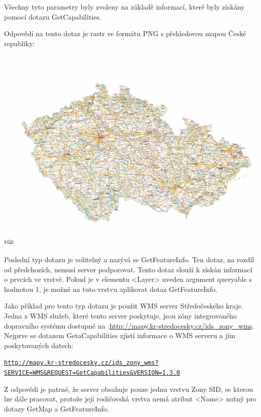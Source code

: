\documentclass[a4paper,12pt]{article}
\begin{document}
Všechny tyto parametry byly zvoleny na základě informací, které byly
získány pomocí dotazu GetCapabilities.

Odpovědí na tento dotaz je rastr ve formátu PNG s přehledovou mapou
České republiky:

 \includegraphics[scale=0.5]{figures/GetMapResponse}


Poslední typ dotazu je volitelný a nazývá se GetFeatureInfo. Ten
dotaz, na rozdíl od předchozích, nemusí server podporovat.  Tento
dotaz slouží k získán informací o prvcích ve vrstvě. Pokud je v
elementu <Layer> uveden argument queryable s hodnotou 1, je možné na
tuto vrstvu aplikovat dotaz GetFeatureInfo.

Jako příklad pro tento typ dotazu je použit WMS server Středočeského
kraje. Jedna z WMS služeb, které tento server poskytuje, jsou zóny
integrovaného dopravního systému dostupné na
:\url{http://mapy.kr-stredocesky.cz/ids_zony_wms}.  Nejprve se dotazem
GetaCapabilities zjistí informace o WMS serveru a jím poskytovaných
datech:

\newcommand{\StredoceskygetCap}{http://mapy.kr-stredocesky.cz/ids_zony_wms?SERVICE=WMS&REQUEST=GetCapabilities}
\begin{alltt}\footnotesize
\href{\StredoceskygetCap}{http://mapy.kr-stredocesky.cz/ids\_zony\_wms?}
\href{\StredoceskygetCap}{SERVICE=WMS\&REQUEST=GetCapabilities\&VERSION=1.3.0}
\end{alltt}

Z odpovědi je patrné, že server obsahuje pouze jednu vrstvu Zony SID,
se kterou lze dále pracovat, protože její rodičovská vrstva nemá
atribut <Name> nutný pro dotazy GetMap a GetFeatureInfo.
\end{document}

